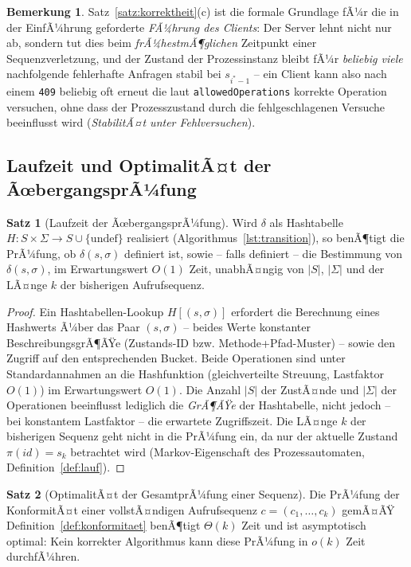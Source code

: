 ﻿\documentclass[a4paper,12pt]{article}
\theoremstyle{definition}
\newtheorem{satz}{Satz}
\newtheorem{bemerkung}{Bemerkung}
\begin{document}
\begin{bemerkung}
	Satz~\ref{satz:korrektheit}(c) ist die formale Grundlage fÃ¼r die in der EinfÃ¼hrung
	geforderte \emph{FÃ¼hrung des Clients}: Der Server lehnt nicht nur ab, sondern tut dies
	beim \emph{frÃ¼hestmÃ¶glichen} Zeitpunkt einer Sequenzverletzung, und der Zustand der
	Prozessinstanz bleibt fÃ¼r \emph{beliebig viele} nachfolgende fehlerhafte Anfragen
	stabil bei $s_{i^\ast-1}$ -- ein Client kann also nach einem \texttt{409} beliebig oft
	erneut die laut \texttt{allowedOperations} korrekte Operation versuchen, ohne dass
	der Prozesszustand durch die fehlgeschlagenen Versuche beeinflusst wird
	(\emph{StabilitÃ¤t unter Fehlversuchen}).
\end{bemerkung}

\subsection{Laufzeit und OptimalitÃ¤t der ÃœbergangsprÃ¼fung}

\begin{satz}[Laufzeit der ÃœbergangsprÃ¼fung]
	\label{satz:laufzeit-pruefung}
	Wird $\delta$ als Hashtabelle $H: S \times \Sigma \to S \cup \{\text{undef}\}$
	realisiert (Algorithmus~\ref{lst:transition}), so benÃ¶tigt die PrÃ¼fung, ob
	$\delta(s,\sigma)$ definiert ist, sowie -- falls definiert -- die Bestimmung von
	$\delta(s,\sigma)$, im Erwartungswert $O(1)$ Zeit, unabhÃ¤ngig von $|S|$, $|\Sigma|$
	und der LÃ¤nge $k$ der bisherigen Aufrufsequenz.
\end{satz}

\begin{proof}
	Ein Hashtabellen-Lookup $H[(s,\sigma)]$ erfordert die Berechnung eines Hashwerts Ã¼ber
	das Paar $(s,\sigma)$ -- beides Werte konstanter BeschreibungsgrÃ¶ÃŸe (Zustands-ID bzw.
	Methode+Pfad-Muster) -- sowie den Zugriff auf den entsprechenden Bucket. Beide
	Operationen sind unter Standardannahmen an die Hashfunktion (gleichverteilte Streuung,
	Lastfaktor $O(1)$) im Erwartungswert $O(1)$. Die Anzahl $|S|$ der ZustÃ¤nde und
	$|\Sigma|$ der Operationen beeinflusst lediglich die \emph{GrÃ¶ÃŸe} der Hashtabelle,
	nicht jedoch -- bei konstantem Lastfaktor -- die erwartete Zugriffszeit. Die LÃ¤nge $k$
	der bisherigen Sequenz geht nicht in die PrÃ¼fung ein, da nur der aktuelle Zustand
	$\pi(id)=s_{k}$ betrachtet wird (Markov-Eigenschaft des Prozessautomaten,
	Definition~\ref{def:lauf}). \qedhere
\end{proof}

\begin{satz}[OptimalitÃ¤t der GesamtprÃ¼fung einer Sequenz]
	\label{satz:optimalitaet-sequenz}
	Die PrÃ¼fung der KonformitÃ¤t einer vollstÃ¤ndigen Aufrufsequenz $c=(c_1,\ldots,c_k)$
	gemÃ¤ÃŸ Definition~\ref{def:konformitaet} benÃ¶tigt $\Theta(k)$ Zeit und ist
	asymptotisch optimal: Kein korrekter Algorithmus kann diese PrÃ¼fung in $o(k)$ Zeit
	durchfÃ¼hren.
\end{satz}
\end{document}
